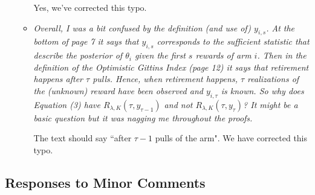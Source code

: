 \documentclass[11pt]{article}
\newcommand{\1}{\ensuremath{\mathbf{1}}} %
\theoremstyle{thm-sf}
\begin{document}
\begin{enumerate}
\begin{itemize}
			 Yes, we've corrected this typo.
		 
		 	\item {\it Overall, I was a bit confused by the definition (and use of) $y_{i,s}$. At the bottom of page 7 it says that $y_{i,s}$ corresponds to the sufficient statistic that describe the posterior of $\theta_i$ given the first $s$ rewards of arm $i$. Then in the definition of the Optimistic Gittins Index (page 12) it says that retirement happens after $\tau$ pulls. Hence, when retirement happens, $\tau$ realizations of the (unknown) reward have been observed and $y_{i,\tau}$ is known. 
		 		So why does Equation (3) have $R_{\lambda,K}(\tau, y_{\tau-1})$ and not $R_{\lambda,K}(\tau, y_{\tau})$? It might be a basic question but it was nagging me throughout the proofs.
	 		}
	 		
	 		The text should say ``after $\tau -1$ pulls of the arm". We have corrected this typo.
			 
			 
		\end{itemize}
	
	\end{enumerate}

	\subsection{Responses to Minor Comments}
	
\end{document}
